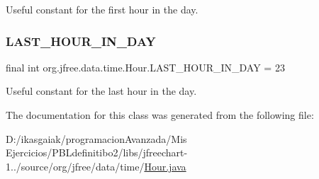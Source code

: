 Useful constant for the first hour in the day. \mbox{\label{classorg_1_1jfree_1_1data_1_1time_1_1_hour_a9ffb1328d0259a7ad771b6dcbc55ae31}} 
\subsubsection{\texorpdfstring{L\+A\+S\+T\+\_\+\+H\+O\+U\+R\+\_\+\+I\+N\+\_\+\+D\+AY}{LAST\_HOUR\_IN\_DAY}}
{\footnotesize\ttfamily final int org.\+jfree.\+data.\+time.\+Hour.\+L\+A\+S\+T\+\_\+\+H\+O\+U\+R\+\_\+\+I\+N\+\_\+\+D\+AY = 23\hspace{0.3cm}{\ttfamily [static]}}

Useful constant for the last hour in the day. 

The documentation for this class was generated from the following file\+:\begin{DoxyCompactItemize}
\item 
D\+:/ikasgaiak/programacion\+Avanzada/\+Mis Ejercicios/\+P\+B\+Ldefinitibo2/libs/jfreechart-\/1../source/org/jfree/data/time/\mbox{\hyperlink{_hour_8java}{Hour.\+java}}\end{DoxyCompactItemize}
